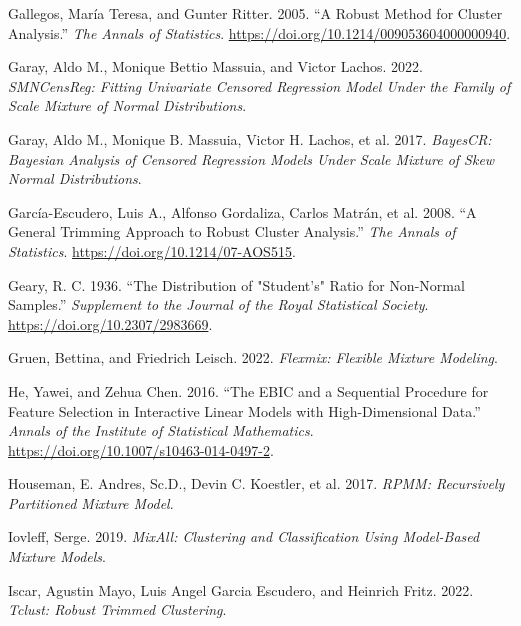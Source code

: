 \begin{CSLReferences}{1}{0}
\leavevmode{}%
Gallegos, María Teresa, and Gunter Ritter. 2005. {``A Robust Method for Cluster Analysis.''} \emph{The Annals of Statistics}. \url{https://doi.org/10.1214/009053604000000940}.

\leavevmode{}%
Garay, Aldo M., Monique Bettio Massuia, and Victor Lachos. 2022. \emph{SMNCensReg: Fitting Univariate Censored Regression Model Under the Family of Scale Mixture of Normal Distributions}.

\leavevmode{}%
Garay, Aldo M., Monique B. Massuia, Victor H. Lachos, et al. 2017. \emph{BayesCR: Bayesian Analysis of Censored Regression Models Under Scale Mixture of Skew Normal Distributions}.

\leavevmode{}%
García-Escudero, Luis A., Alfonso Gordaliza, Carlos Matrán, et al. 2008. {``A General Trimming Approach to Robust Cluster Analysis.''} \emph{The Annals of Statistics}. \url{https://doi.org/10.1214/07-AOS515}.

\leavevmode{}%
Geary, R. C. 1936. {``The {Distribution} of "{Student}'s" {Ratio} for {Non-Normal Samples}.''} \emph{Supplement to the Journal of the Royal Statistical Society}. \url{https://doi.org/10.2307/2983669}.

\leavevmode{}%
Gruen, Bettina, and Friedrich Leisch. 2022. \emph{Flexmix: Flexible Mixture Modeling}.

\leavevmode{}%
He, Yawei, and Zehua Chen. 2016. {``The {EBIC} and a Sequential Procedure for Feature Selection in Interactive Linear Models with High-Dimensional Data.''} \emph{Annals of the Institute of Statistical Mathematics}. \url{https://doi.org/10.1007/s10463-014-0497-2}.

\leavevmode{}%
Houseman, E. Andres, Sc.D., Devin C. Koestler, et al. 2017. \emph{RPMM: Recursively Partitioned Mixture Model}.

\leavevmode{}%
Iovleff, Serge. 2019. \emph{MixAll: Clustering and Classification Using Model-Based Mixture Models}.

\leavevmode{}%
Iscar, Agustin Mayo, Luis Angel Garcia Escudero, and Heinrich Fritz. 2022. \emph{Tclust: Robust Trimmed Clustering}.


\end{CSLReferences}
